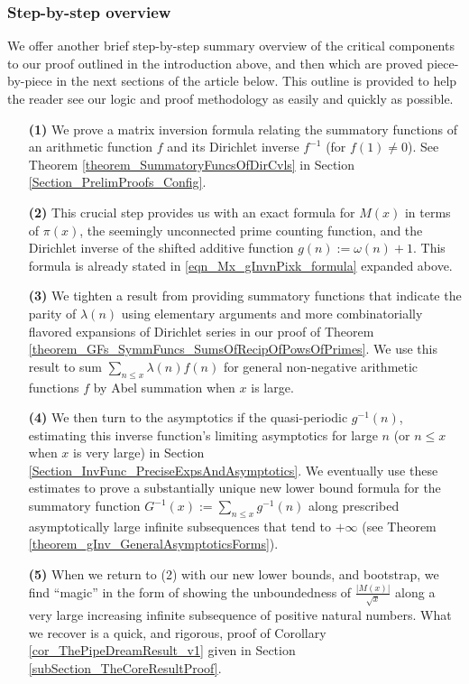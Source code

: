 \documentclass[11pt,reqno,a4letter]{article}
\numberwithin{figure}{section}
\numberwithin{table}{section}
\theoremstyle{plain}
\numberwithin{theorem}{section}
\theoremstyle{definition}
\begin{document}
\subsubsection{Step-by-step overview} 

We offer another brief step-by-step summary overview of the critical components 
to our proof outlined in the introduction above, 
and then which are proved piece-by-piece in the next sections of the article below. 
This outline is provided to help 
the reader see our logic and proof methodology as easily and quickly as possible. 
\begin{itemize} 

\item[\textbf{(1)}] We prove a matrix inversion formula relating the summatory 
           functions of an arithmetic function $f$ and its Dirichlet inverse $f^{-1}$ (for $f(1) \neq 0$). 
           See 
           Theorem \ref{theorem_SummatoryFuncsOfDirCvls} in 
           Section \ref{Section_PrelimProofs_Config}.  
\item[\textbf{(2)}] This crucial step provides us with an exact formula for $M(x)$ in terms of $\pi(x)$, the seemingly 
           unconnected prime counting function, and the 
           Dirichlet inverse of the shifted additive function $g(n) := \omega(n)+1$. This 
           formula is already stated in \eqref{eqn_Mx_gInvnPixk_formula} expanded above.  
\item[\textbf{(3)}] We tighten a result from \cite[\S 7]{MV} providing summatory functions that indicate the parity of 
           $\lambda(n)$ using elementary arguments and more combinatorially flavored expansions of Dirichlet series in 
           our proof of Theorem \ref{theorem_GFs_SymmFuncs_SumsOfRecipOfPowsOfPrimes}. 
           We use this result to sum $\sum_{n \leq x} \lambda(n) f(n)$ for general non-negative arithmetic 
           functions $f$ by Abel summation when $x$ is large. 
\item[\textbf{(4)}] We then turn to the asymptotics if the quasi-periodic $g^{-1}(n)$, estimating this inverse function's 
           limiting asymptotics for large $n$ (or $n \leq x$ when $x$ is very large) in 
           Section \ref{Section_InvFunc_PreciseExpsAndAsymptotics}. 
           We eventually use these estimates to prove a substantially unique new lower bound formula 
           for the summatory function $G^{-1}(x) := \sum_{n \leq x} g^{-1}(n)$ along prescribed asymptotically large 
           infinite subsequences that tend to $+\infty$ (see Theorem \ref{theorem_gInv_GeneralAsymptoticsForms}). 
\item[\textbf{(5)}] When we return to (2) with our new lower bounds, and bootstrap, we find ``magic'' in the form of 
           showing the unboundedness of $\frac{|M(x)|}{\sqrt{x}}$ along a very large increasing infinite subsequence 
           of positive natural numbers. What we recover is a quick, and rigorous, proof of 
           Corollary \ref{cor_ThePipeDreamResult_v1} given in 
           Section \ref{subSection_TheCoreResultProof}. 
           
\end{itemize} 
\end{document}
